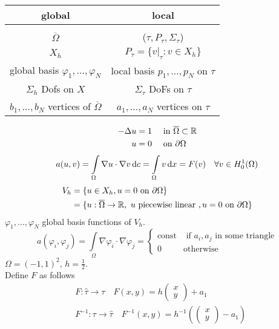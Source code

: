 \begin{tabular}{c|c}
	global  & local \\ \hline 
	&\\
	$\overline{\Omega} $&  ($\tau , P_\tau, \Sigma_\tau$) \\
	$X_h$ & $P_\tau = \{ v|_\tau :v \in X_h  \}$ \\
	global basis $\varphi_1,\dots,\varphi_N$ & local basis $p_1,\dots,p_N$ on $\tau$\\
	$\Sigma_h$ Dofs on $X$ & $\Sigma_\tau$ DoFs on $\tau$\\
	$b_1,\dots,b_N$ vertices of $\overline{\Omega}$ & $a_1,\dots,a_N$ vertices on $\tau$		
\end{tabular}

\begin{example}
	\begin{align*}
		- \Delta u &=1 \quad \text{ in } \overline{\Omega} \subset \mathbb{R}\\
		u &=0 \quad \text{ on } \partial \Omega
	\end{align*}
	\begin{equation*}
		a(u,v) = \int \limits_\Omega  \nabla u \cdot \nabla v \mathop{}\!\mathrm{d} c = \int \limits_\Omega v\mathop{}\!\mathrm{d} x = F(v) \quad \forall v \in H^1_0(\Omega)
	\end{equation*}
	\begin{align*}
		V_h &= \{ u \in X_h, u=0 \text{ on } \partial \Omega  \}\\
			&= \{ u: \overline{\Omega} \to \mathbb{R} , \ u \text{ piecewise linear }, u=0 \text{ on } \partial \Omega   \}
	\end{align*}
	$\varphi_1,\dots,\varphi_N$ global basis functions of $V_h$.
	\begin{equation*}
		a(\varphi_i,\varphi_j) = \int \limits_\Omega \nabla \varphi_i \cdot \nabla \varphi_j = 
		\begin{cases}
		\text{const} & \text{ if } a_i,a_j \text{ in some triangle}\\
		0 & \text{otherwise}
		\end{cases}
	\end{equation*}
	$\Omega = (-1,1)^2$, $h = \frac{1}{2}$.
	\\
	Define $F$ as follows
	\begin{align*}
		&{} F\colon \hat{\tau} \to \tau \quad F(x,y) = h \begin{pmatrix} x\\ y \end{pmatrix} + a_1\\
		&{} F^{-1}\colon \tau \to \hat{\tau} \quad F^{-1}(x,y) = h^{-1} \left ( \begin{pmatrix}x \\ y \end{pmatrix} - a_1 \right )
	\end{align*}
	

\end{example}
